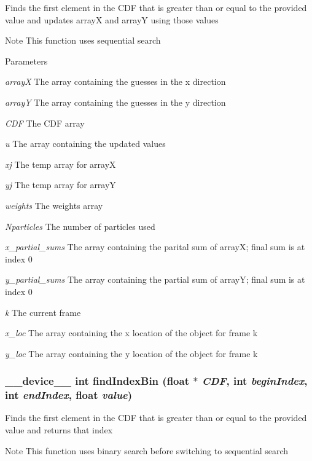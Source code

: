 \label{ex__particle__CUDA__float_8cu_aef627a69a7a035b4e1c8038dffde6e69}
Finds the first element in the CDF that is greater than or equal to the provided value and updates arrayX and arrayY using those values \begin{DoxyNote}{Note}
This function uses sequential search 
\end{DoxyNote}

\begin{DoxyParams}{Parameters}
\item[{\em arrayX}]The array containing the guesses in the x direction \item[{\em arrayY}]The array containing the guesses in the y direction \item[{\em CDF}]The CDF array \item[{\em u}]The array containing the updated values \item[{\em xj}]The temp array for arrayX \item[{\em yj}]The temp array for arrayY \item[{\em weights}]The weights array \item[{\em Nparticles}]The number of particles used \item[{\em x\_\-partial\_\-sums}]The array containing the parital sum of arrayX; final sum is at index 0 \item[{\em y\_\-partial\_\-sums}]The array containing the partial sum of arrayY; final sum is at index 0 \item[{\em k}]The current frame \item[{\em x\_\-loc}]The array containing the x location of the object for frame k \item[{\em y\_\-loc}]The array containing the y location of the object for frame k \end{DoxyParams}
\hypertarget{ex__particle__CUDA__float_8cu_a296be3d3e8ce2a2636c8658d703abf54}{
\subsubsection[{findIndexBin}]{\setlength{\rightskip}{0pt plus 5cm}\_\-\_\-device\_\-\_\- int findIndexBin (float $\ast$ {\em CDF}, \/  int {\em beginIndex}, \/  int {\em endIndex}, \/  float {\em value})}}
\label{ex__particle__CUDA__float_8cu_a296be3d3e8ce2a2636c8658d703abf54}
Finds the first element in the CDF that is greater than or equal to the provided value and returns that index \begin{DoxyNote}{Note}
This function uses binary search before switching to sequential search 
\end{DoxyNote}

